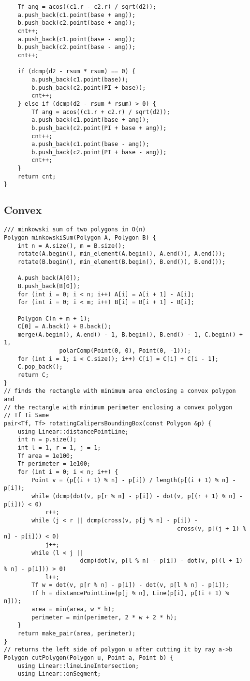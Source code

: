 \documentclass[FSZ,a4paper,onesided]{article}
\begin{document}
\begin{multicols*}{\COLS}
\begin{lstlisting}
    Tf ang = acos((c1.r - c2.r) / sqrt(d2));
    a.push_back(c1.point(base + ang));
    b.push_back(c2.point(base + ang));
    cnt++;
    a.push_back(c1.point(base - ang));
    b.push_back(c2.point(base - ang));
    cnt++;

    if (dcmp(d2 - rsum * rsum) == 0) {
        a.push_back(c1.point(base));
        b.push_back(c2.point(PI + base));
        cnt++;
    } else if (dcmp(d2 - rsum * rsum) > 0) {
        Tf ang = acos((c1.r + c2.r) / sqrt(d2));
        a.push_back(c1.point(base + ang));
        b.push_back(c2.point(PI + base + ang));
        cnt++;
        a.push_back(c1.point(base - ang));
        b.push_back(c2.point(PI + base - ang));
        cnt++;
    }
    return cnt;
}
\end{lstlisting}
\subsection{Convex}
\begin{lstlisting}
/// minkowski sum of two polygons in O(n)
Polygon minkowskiSum(Polygon A, Polygon B) {
    int n = A.size(), m = B.size();
    rotate(A.begin(), min_element(A.begin(), A.end()), A.end());
    rotate(B.begin(), min_element(B.begin(), B.end()), B.end());

    A.push_back(A[0]);
    B.push_back(B[0]);
    for (int i = 0; i < n; i++) A[i] = A[i + 1] - A[i];
    for (int i = 0; i < m; i++) B[i] = B[i + 1] - B[i];

    Polygon C(n + m + 1);
    C[0] = A.back() + B.back();
    merge(A.begin(), A.end() - 1, B.begin(), B.end() - 1, C.begin() + 1,
                polarComp(Point(0, 0), Point(0, -1)));
    for (int i = 1; i < C.size(); i++) C[i] = C[i] + C[i - 1];
    C.pop_back();
    return C;
}
// finds the rectangle with minimum area enclosing a convex polygon and
// the rectangle with minimum perimeter enclosing a convex polygon
// Tf Ti Same
pair<Tf, Tf> rotatingCalipersBoundingBox(const Polygon &p) {
    using Linear::distancePointLine;
    int n = p.size();
    int l = 1, r = 1, j = 1;
    Tf area = 1e100;
    Tf perimeter = 1e100;
    for (int i = 0; i < n; i++) {
        Point v = (p[(i + 1) % n] - p[i]) / length(p[(i + 1) % n] - p[i]);
        while (dcmp(dot(v, p[r % n] - p[i]) - dot(v, p[(r + 1) % n] - p[i])) < 0)
            r++;
        while (j < r || dcmp(cross(v, p[j % n] - p[i]) -
                                                  cross(v, p[(j + 1) % n] - p[i])) < 0)
            j++;
        while (l < j ||
                      dcmp(dot(v, p[l % n] - p[i]) - dot(v, p[(l + 1) % n] - p[i])) > 0)
            l++;
        Tf w = dot(v, p[r % n] - p[i]) - dot(v, p[l % n] - p[i]);
        Tf h = distancePointLine(p[j % n], Line(p[i], p[(i + 1) % n]));
        area = min(area, w * h);
        perimeter = min(perimeter, 2 * w + 2 * h);
    }
    return make_pair(area, perimeter);
}
// returns the left side of polygon u after cutting it by ray a->b
Polygon cutPolygon(Polygon u, Point a, Point b) {
    using Linear::lineLineIntersection;
    using Linear::onSegment;


\end{lstlisting}
\end{multicols*}
\end{document}

